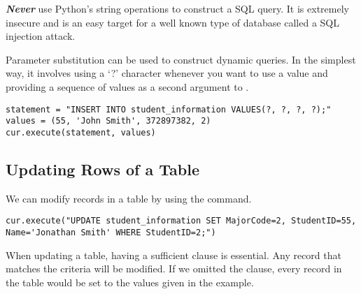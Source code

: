 \begin{warn}
\emph{\textbf{Never}} use Python's string operations to construct a SQL query.
It is extremely insecure and is an easy target for a well known type of database called a SQL injection attack.

Parameter substitution can be used to construct dynamic queries.
In the simplest way, it involves using a `?' character whenever you want to use a value and providing a
sequence of values as a second argument to .
\begin{lstlisting}
statement = "INSERT INTO student_information VALUES(?, ?, ?, ?);"
values = (55, 'John Smith', 372897382, 2)
cur.execute(statement, values)
\end{lstlisting}
\end{warn}

\subsection*{Updating Rows of a Table}
We can modify records in a table by using the  command.
\begin{lstlisting}
cur.execute("UPDATE student_information SET MajorCode=2, StudentID=55, Name='Jonathan Smith' WHERE StudentID=2;")
\end{lstlisting}

\begin{info}
When updating a table, having a sufficient  clause is essential.  Any record that matches the criteria will be modified.
If we omitted the  clause, every record in the table would be set to the values given in the example.
\end{info}

